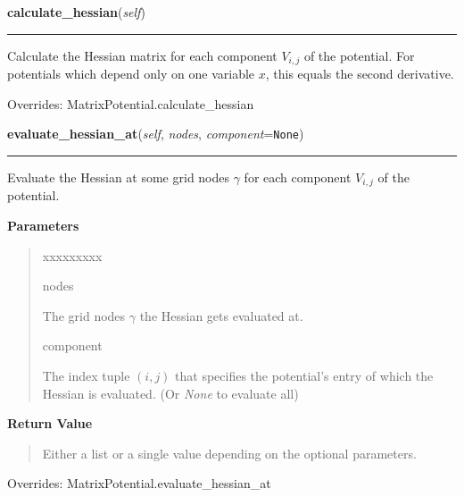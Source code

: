 \hspace{.8\funcindent}\begin{boxedminipage}{\funcwidth}

    \raggedright \textbf{calculate\_hessian}(\textit{self})

    \vspace{-1.5ex}

    \rule{\textwidth}{0.5\fboxrule}
\setlength{\parskip}{2ex}
    Calculate the Hessian matrix for each component $V_{i,j}$ of the
    potential. For potentials which depend only on one variable $x$, this
    equals the second derivative.

\setlength{\parskip}{1ex}


      Overrides: MatrixPotential.calculate\_hessian

    \end{boxedminipage}

    \vspace{0.5ex}

\hspace{.8\funcindent}\begin{boxedminipage}{\funcwidth}

    \raggedright \textbf{evaluate\_hessian\_at}(\textit{self}, \textit{nodes}, \textit{component}={\tt None})

    \vspace{-1.5ex}

    \rule{\textwidth}{0.5\fboxrule}
\setlength{\parskip}{2ex}
    Evaluate the Hessian at some grid nodes $\gamma$ for
    each component $V_{i,j}$ of the potential.

\setlength{\parskip}{1ex}
      \textbf{Parameters}
      \vspace{-1ex}

      \begin{quote}
        \begin{Ventry}{xxxxxxxxx}

          \item[nodes]

          The grid nodes $\gamma$ the Hessian gets
          evaluated at.

          \item[component]

          The index tuple $\left(i,j \right)$ that specifies
          the potential's entry of which the Hessian is evaluated. (Or
          \textit{None} to evaluate all)

        \end{Ventry}

      \end{quote}

      \textbf{Return Value}
    \vspace{-1ex}

      \begin{quote}
      Either a list or a single value depending on the optional parameters.

      \end{quote}



      Overrides: MatrixPotential.evaluate\_hessian\_at

    \end{boxedminipage}


